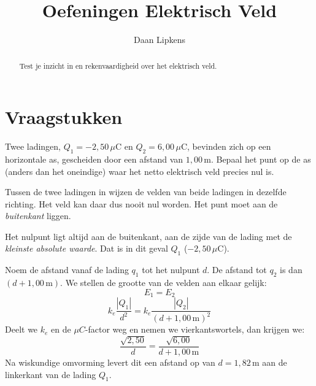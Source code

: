 \documentclass{ximera}
\title{Oefeningen Elektrisch Veld}
\author{Daan Lipkens}
\begin{document}
\begin{abstract}
    Test je inzicht in en rekenvaardigheid over het elektrisch veld.
\end{abstract}
\maketitle



\section{Vraagstukken}

\begin{exercise}\label{vb:elektrisch_veld_2ladingen}
    Twee ladingen, $Q_1 = -2,50 \,\mu\mathrm{C}$ en $Q_2 = 6,00 \,\mu\mathrm{C}$, bevinden zich op een horizontale as, gescheiden door een afstand van $1,00\,\mathrm{ m}$. Bepaal het punt op de as (anders dan het oneindige) waar het netto elektrisch veld precies nul is.
    

        \begin{hint}
            Tussen de twee ladingen in wijzen de velden van beide ladingen in dezelfde richting. Het veld kan daar dus nooit nul worden. Het punt moet aan de \textit{buitenkant} liggen.
        \end{hint}
        \begin{hint}
            Het nulpunt ligt altijd aan de buitenkant, aan de zijde van de lading met de \textit{kleinste absolute waarde}. Dat is in dit geval $Q_1$ ($-2,50\,\mu\mathrm{C}$).
        \end{hint}
        \begin{solution}\nl
            Noem de afstand vanaf de lading $q_1$ tot het nulpunt $d$. De afstand tot $q_2$ is dan $(d + 1,00\,\mathrm{m})$. We stellen de grootte van de velden aan elkaar gelijk:
            $$ E_1 = E_2 $$
            $$ k_e \frac{|Q_1|}{d^2} = k_e \frac{|Q_2|}{(d + 1,00 \,\mathrm{m})^2} $$
            Deelt we $k_e$ en de $\mu C$-factor weg en nemen we vierkantswortels, dan krijgen we:
            $$ \frac{\sqrt{2,50}}{d} = \frac{\sqrt{6,00}}{d + 1,00\,\mathrm{m}} $$
            Na wiskundige omvorming levert dit een afstand op van $d = 1,82\,\mathrm{m}$ aan de linkerkant van de lading $Q_1$.
        \end{solution}
\end{exercise}
\end{document}
